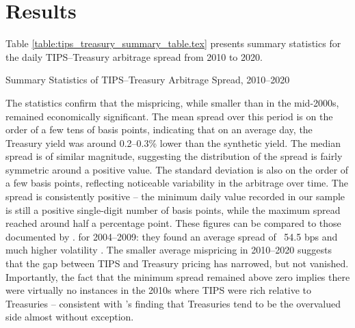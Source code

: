 \documentclass[12pt]{article}
\begin{document}
\section{Results}
 Table \ref{table:tips_treasury_summary_table.tex} presents summary statistics for the daily TIPS–Treasury arbitrage spread from 2010 to 2020. 
 \begin{table}
  \centering
  
  \caption{
    Summary Statistics of TIPS–Treasury Arbitrage Spread, 2010–2020
  }
  \label{table:tips_treasury_summary_table.tex}
  \end{table}
 The statistics confirm that the mispricing, while smaller than in the mid-2000s, remained economically significant. 
 The mean spread over this period is on the order of a few tens of basis points, indicating that on an average day, the Treasury yield was around 
 0.2–0.3\% lower than the synthetic yield. The median spread is of similar magnitude, suggesting the distribution of the spread is fairly symmetric 
 around a positive value. The standard deviation is also on the order of a few basis points, reflecting noticeable variability in the arbitrage over 
 time. The spread is consistently positive – the minimum daily value recorded in our sample is still a positive single-digit number of basis points, 
 while the maximum spread reached around half a percentage point. These figures can be compared to those documented by \cite{Fleckenstein}. for 
 2004–2009: they found an average spread of ~54.5 bps and much higher volatility \citep{Fleckenstein}. The smaller average mispricing in 
 2010–2020 suggests that the gap between TIPS and Treasury pricing has narrowed, but not vanished. Importantly, the fact that the minimum spread 
 remained above zero implies there were virtually no instances in the 2010s where TIPS were rich relative to Treasuries – consistent with
  \cite{Fleckenstein}’s finding that Treasuries tend to be the overvalued side almost without exception.
 
\end{document}

